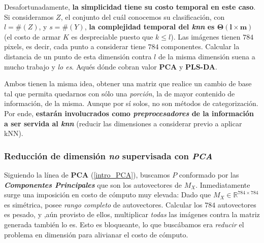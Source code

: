 Desafortunadamente, \textbf{la simplicidad tiene su costo temporal en este caso}. Si consideramos $Z$, el conjunto del cu\'al conocemos su clasificaci\'on, con $l = \#(Z)$, y $s = \#(Y)$, \textbf{la complejidad temporal del \textit{knn} es $\mathbf{\Theta(l \times m)}$} (el costo de armar $K$ es despreciable puesto que $k \leq l$). Las im\'agenes tienen $784$ pixels, es decir, cada punto a considerar tiene $784$ componentes. Calcular la distancia de un punto de esta dimensi\'on contra \textit{$l$} de la misma dimensi\'on suena a mucho trabajo y \textit{lo es}. Aqu\' es d\'onde cobran valor \textbf{PCA} y \textbf{PLS-DA}.

Ambos tienen la misma idea, obtener una matriz que realice un cambio de base tal que permita quedarnos con s\'olo una \textit{porci\'on}, la de mayor contenido de informaci\'on, de la misma. Aunque por s\'i solos, no son m\'etodos de categorizaci\'on. Por ende, \textbf{estar\'an involucrados como \textit{preprocesadores} de la informaci\'on a ser servida al \textit{knn}} (reducir las dimensiones a considerar previo a aplicar kNN).

\subsubsection{Reducci\'on de dimensi\'on \textit{no} supervisada con \textit{PCA}}

Siguiendo la l\'inea de \textbf{PCA} (\ref{intro_PCA}), buscamos $P$ conformado por las \textit{\textbf{Componentes Principales}} que son los autovectores de $M_{X}$. Inmediatamente surge una imposici\'on en costo de c\'omputo muy elevada: Dado que $M_{X} \in \mathbb{R}^{784 \times 784}$ es sim\'etrica, posee \textit{rango completo} de autovectores. Calcular los $784$ autovectores es pesado, y ,a\'un provisto de ellos, multiplicar \textit{todas} las im\'agenes contra la matriz generada tambi\'en lo es. Esto es bloqueante, lo que busc\'abamos era \textit{reducir} el problema en dimensi\'on para alivianar el costo de c\'omputo.

